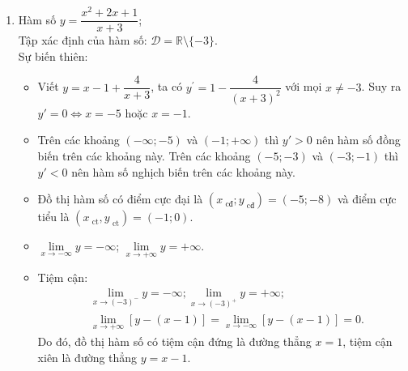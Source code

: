 \begin{bt}
{\begin{enumerate}
\begin{center}
			\end{center}
			\begin{itemize}
				\item Giao  điểm của đồ thị hàm số với trục tung là điểm $(0;-4)$.
				\item Ta có $y=0 \Leftrightarrow 2x^{2}-x+4=0$. Phương trình này vô nghiệm nên đồ thị hàm số không cắt  trục hoành.
				\item Đồ thị hàm số nhận giao điểm $I(1;3)$ của hai đường tiệm cận làm tâm đối xứng và nhận hai đường phân giác của góc tạo  bởi hai đường tiệm cận này làm các trục đối xứng.
			\end{itemize}
			 \item Hàm số $y=\dfrac{x^2+2x+1}{x+3}$;\\
			Tập  xác định của hàm số: $\mathscr{D}=\mathbb{R} \setminus\{-3\}$.\\
			 Sự biến thiên:
			\begin{itemize}
				\item Viết $y=x-1+\dfrac{4}{x+3}$, ta có $y^{\prime}=1-\dfrac{4}{(x+3)^{2}}$ với mọi  $x \neq -3$.
				Suy ra  $ y'=0\Leftrightarrow x=-5$ hoặc $x=-1$.
				\item Trên các khoảng $\left( -\infty;-5 \right)$ và $\left(-1;+\infty \right)$ thì $y'>0$  nên hàm số đồng biến trên các khoảng này.
				Trên các khoảng $\left(-5;-3 \right)$ và $\left( -3;-1\right)$ thì $y'<0$ nên hàm số nghịch biến trên các khoảng này. 
				\item Đồ thị hàm số  có điểm cực đại là $(x_{\text{ cđ}};y_{\text{ cđ}})=\left(-5;-8\right)$ và điểm cực tiểu là $(x_{\text{ ct}},y_{\text{ ct}})=\left(-1; 0 \right)$.
				\item $\lim\limits _{x \rightarrow-\infty} y=-\infty$; $\lim\limits _{x \rightarrow+\infty} y=+\infty$. 
				\item Tiệm  cận:
				\begin{align*}
					&\lim\limits _{x \rightarrow  (-3)^{-}} y=-\infty; \lim\limits _{x \rightarrow (-3)^{+}} y=+\infty;\\
					&\lim\limits  _{x \rightarrow+\infty}[y-(x-1)]= \lim\limits _{x \rightarrow-\infty}[y-(x-1)]=0.
				\end{align*}
				Do đó, đồ thị hàm số có tiệm cận đứng là đường thẳng $x=1$, tiệm cận xiên là đường thẳng $y=x-1$.\\ 

\end{itemize}
\end{enumerate}}
\end{bt}
